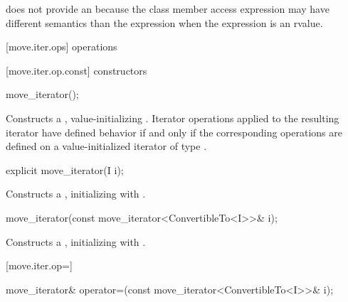 \pnum
\enternote {} does not provide an  because the class member access
expression  may have different semantics than the expression
 when the expression  is an rvalue.\exitnote

[move.iter.ops]{ operations}

[move.iter.op.const]{ constructors}

%
\begin{itemdecl}
move_iterator();
\end{itemdecl}

\begin{itemdescr}
\pnum
\effects Constructs a , value-initializing
. Iterator operations applied to the resulting
iterator have defined behavior if and only if the corresponding operations are defined
on a value-initialized iterator of type .
\end{itemdescr}


%
\begin{itemdecl}
explicit move_iterator(I i);
\end{itemdecl}

\begin{itemdescr}
\pnum
\effects Constructs a , initializing
 with .
\end{itemdescr}


%
\begin{itemdecl}
move_iterator(const move_iterator<ConvertibleTo<I>>& i);
\end{itemdecl}

\begin{itemdescr}
\pnum
\effects Constructs a , initializing
 with .
\end{itemdescr}

[move.iter.op=]{}

%
%
\begin{itemdecl}
move_iterator& operator=(const move_iterator<ConvertibleTo<I>>& i);
\end{itemdecl}

